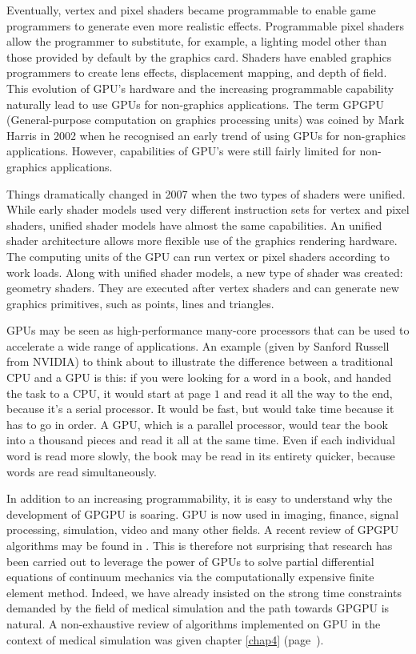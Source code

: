 Eventually, vertex and pixel shaders became programmable to enable game programmers to generate even more realistic effects. Programmable pixel shaders allow the programmer to substitute, for example, a lighting model other than those provided by default by the graphics card. Shaders have enabled graphics programmers to create lens effects, displacement mapping, and depth of field. This evolution of GPU's hardware and the increasing programmable capability naturally lead to use GPUs for non-graphics applications. The term GPGPU (General-purpose computation on graphics processing units) was coined by Mark Harris in 2002 when he recognised an early trend of using GPUs for non-graphics applications. However, capabilities of GPU's were still fairly limited for non-graphics applications. 

Things dramatically changed in 2007 when the two types of shaders were unified. While early shader models used very different instruction sets for vertex and pixel shaders, unified shader models have almost the same capabilities. An unified shader architecture allows more flexible use of the graphics rendering hardware. The computing units of the GPU can run vertex or pixel shaders according to work loads. Along with unified shader models, a new type of shader was created: geometry shaders. They are executed after vertex shaders and can generate new graphics primitives, such as points, lines and triangles. 

\bigskip

GPUs may be seen as high-performance many-core processors that can be used to accelerate a wide range of applications. An example (given by Sanford Russell from NVIDIA) to think about to illustrate the difference between a traditional CPU and a GPU is this: if you were looking for a word in a book, and handed the task to a CPU, it would start at page $ 1 $ and read it all the way to the end, because it's a serial processor. It would be fast, but would take time because it has to go in order. A GPU, which is a parallel processor, would tear the book into a thousand pieces and read it all at the same time. Even if each individual word is read more slowly, the book may be read in its entirety quicker, because words are read simultaneously. 

In addition to an increasing programmability, it is easy to understand why the development of GPGPU is soaring. GPU is now used in imaging, finance, signal processing, simulation, video and many other fields. A recent review of GPGPU algorithms may be found in \cite{Owens07}. This is therefore not surprising that research has been carried out to leverage the power of GPUs to solve partial differential equations of continuum mechanics via the computationally expensive finite element method. Indeed, we have already insisted on the strong time constraints demanded by the field of medical simulation and the path towards GPGPU is natural. A non-exhaustive review of algorithms implemented on GPU in the context of medical simulation was given chapter \ref{chap4} (page~\pageref{chap4:GPUMedicalSimulation}). 

